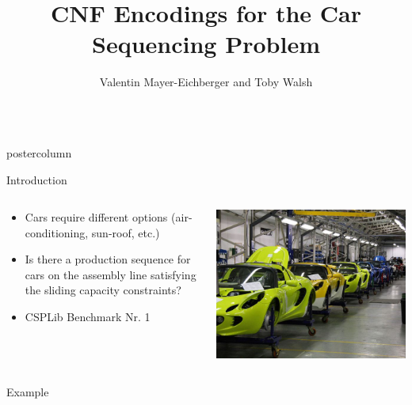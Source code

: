 \documentclass[final]{beamer}
\title{\huge CNF Encodings for the Car Sequencing Problem}
\author{Valentin Mayer-Eichberger and Toby Walsh}
\institute[UNSW]{NICTA and University of New South Wales, Australia}
\newlength{\columnheight}
\begin{document}
\begin{frame}
  \begin{columns}
    \begin{column}{.49\textwidth}
      \begin{beamercolorbox}[center,wd=\textwidth]{postercolumn}
        \begin{minipage}[T]{.95\textwidth}  %
          \parbox[t][\columnheight]{\textwidth}{ %
            \begin{block}{Introduction}
              \begin{columns}
                \begin{column}{.55\textwidth}
                    \begin{itemize}
                        \item Cars require different options (air-conditioning, sun-roof, etc.)
                        \item Is there a production sequence for cars on the assembly line satisfying the sliding capacity constraints?
                        \item CSPLib Benchmark Nr. 1
                            \cite{Regin97}\cite{Gent99}
                    \end{itemize}
                \end{column}
                \begin{column}{.44\textwidth}
                  \centering
                    \includegraphics[width=0.80\linewidth]{figures/cars}
                \end{column}
            \end{columns}
            \end{block}
            \vfill
            \begin{block}{Example}


\end{block}}
\end{minipage}
\end{beamercolorbox}
\end{column}
\end{columns}
\end{frame}
\end{document}
